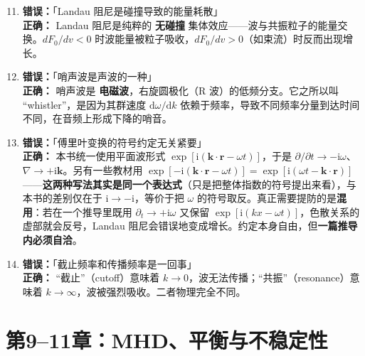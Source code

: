 \documentclass[12pt,a4paper,openany,oneside]{book}
\newcommand{\diff}{\mathrm{d}}
\newcommand{\ii}{\mathrm{i}}
\newcommand{\vect}[1]{\bm{#1}}
\newcommand{\grad}{\nabla}
\begin{document}
\begin{warning}{}{}
\begin{enumerate}
\setcounter{enumi}{10}
\item \textbf{错误：}「Landau 阻尼是碰撞导致的能量耗散」\\
\textbf{正确：} Landau 阻尼是纯粹的 \textbf{无碰撞} 集体效应——波与共振粒子的能量交换。$dF_0/dv<0$ 时波能量被粒子吸收，$dF_0/dv>0$（如束流）时反而出现增长。

\item \textbf{错误：}「哨声波是声波的一种」\\
\textbf{正确：} 哨声波是 \textbf{电磁波}，右旋圆极化（R 波）的低频分支。它之所以叫 ``whistler''，是因为其群速度 $\diff\omega/\diff k$ 依赖于频率，导致不同频率分量到达时间不同，在音频上形成下降的哨音。

\item \textbf{错误：}「傅里叶变换的符号约定无关紧要」\\
\textbf{正确：} 本书统一使用平面波形式 $\exp[\ii(\vect{k}\cdot\vect{r}-\omega t)]$，于是 $\partial/\partial t\to-\ii\omega$、$\grad\to+\ii\vect{k}$。另有一些教材用 $\exp[-\ii(\vect{k}\cdot\vect{r}-\omega t)] = \exp[\ii(\omega t-\vect{k}\cdot\vect{r})]$——\textbf{这两种写法其实是同一个表达式}（只是把整体指数的符号提出来看），与本书的差别仅在于 $\ii\to-\ii$，等价于把 $\omega$ 的符号取反。真正需要提防的是\textbf{混用}：若在一个推导里既用 $\partial_t\to+\ii\omega$ 又保留 $\exp[\ii(kx-\omega t)]$，色散关系的虚部就会反号，Landau 阻尼会错误地变成增长。约定本身自由，但\textbf{一篇推导内必须自洽}。

\item \textbf{错误：}「截止频率和传播频率是一回事」\\
\textbf{正确：} ``截止''（cutoff）意味着 $k\to 0$，波无法传播；``共振''（resonance）意味着 $k\to\infty$，波被强烈吸收。二者物理完全不同。
\end{enumerate}
\end{warning}


\section{第9--11章：MHD、平衡与不稳定性}
\end{document}
